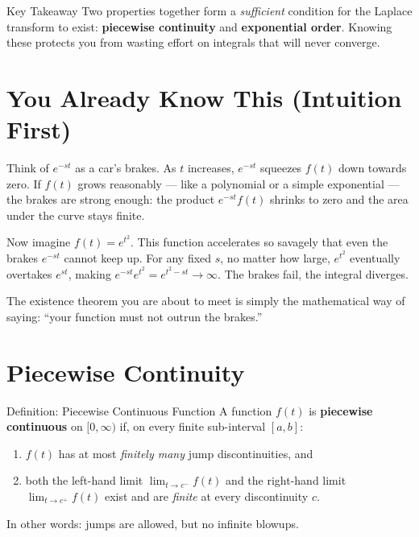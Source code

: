 \documentclass[12pt,a4paper]{article}
\begin{document}
\begin{learnbox}{Key Takeaway}
Two properties together form a \emph{sufficient} condition for the Laplace transform to exist: \textbf{piecewise continuity} and \textbf{exponential order}. Knowing these protects you from wasting effort on integrals that will never converge.
\end{learnbox}

\section{You Already Know This (Intuition First)}

Think of $e^{-st}$ as a car's brakes. As $t$ increases, $e^{-st}$ squeezes $f(t)$ down towards zero. If $f(t)$ grows reasonably --- like a polynomial or a simple exponential --- the brakes are strong enough: the product $e^{-st}f(t)$ shrinks to zero and the area under the curve stays finite.

Now imagine $f(t) = e^{t^2}$. This function accelerates so savagely that even the brakes $e^{-st}$ cannot keep up. For any fixed $s$, no matter how large, $e^{t^2}$ eventually overtakes $e^{st}$, making $e^{-st}e^{t^2} = e^{t^2 - st} \to \infty$. The brakes fail, the integral diverges.

The existence theorem you are about to meet is simply the mathematical way of saying: ``your function must not outrun the brakes.''

\section{Piecewise Continuity}

\begin{infobox}{Definition: Piecewise Continuous Function}
A function $f(t)$ is \textbf{piecewise continuous} on $[0, \infty)$ if, on every finite sub-interval $[a, b]$:
\begin{enumerate}[label=(\roman*)]
  \item $f(t)$ has at most \emph{finitely many} jump discontinuities, and
  \item both the left-hand limit $\lim_{t \to c^-} f(t)$ and the right-hand limit $\lim_{t \to c^+} f(t)$ exist and are \emph{finite} at every discontinuity $c$.
\end{enumerate}
In other words: jumps are allowed, but no infinite blowups.
\end{infobox}
\end{document}
